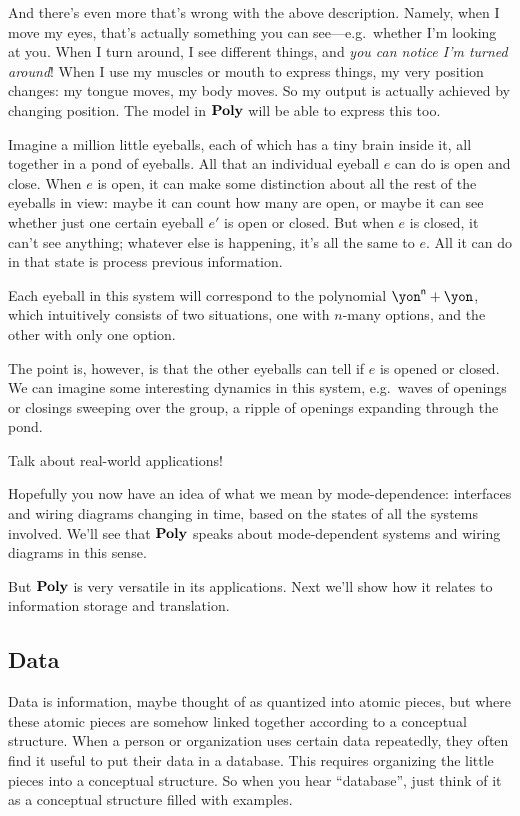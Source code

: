 \documentclass[DynamicalBook]{subfiles}
\begin{document}
And there's even more that's wrong with the above description. Namely, when I move my eyes, that's actually something you can see---e.g.\ whether I'm looking at you. When I turn around, I see different things, and \emph{you can notice I'm turned around}! When I use my muscles or mouth to express things, my very position changes: my tongue moves, my body moves. So my output is actually achieved by changing position. The model in $\textbf{Poly}$ will be able to express this too.

\begin{example}
Imagine a million little eyeballs, each of which has a tiny brain inside it, all together in a pond of eyeballs. All that an individual eyeball $e$ can do is open and close. When $e$ is open, it can make some distinction about all the rest of the eyeballs in view: maybe it can count how many are open, or maybe it can see whether just one certain eyeball $e'$ is open or closed. But when $e$ is closed, it can't see anything; whatever else is happening, it's all the same to $e$. All it can do in that state is process previous information.

Each eyeball in this system will correspond to the polynomial $\yon^\ord{n}+\yon$, which intuitively consists of two situations, one with $n$-many options, and the other with only one option.

The point is, however, is that the other eyeballs can tell if $e$ is opened or closed. We can imagine some interesting dynamics in this system, e.g.\ waves of openings or closings sweeping over the group, a ripple of openings expanding through the pond.

Talk about real-world applications!
\end{example}

Hopefully you now have an idea of what we mean by mode-dependence: interfaces and wiring diagrams changing in time, based on the states of all the systems involved. We'll see that $\textbf{Poly}$ speaks about mode-dependent systems and wiring diagrams in this sense. 

But $\textbf{Poly}$ is very versatile in its applications. Next we'll show how it relates to information storage and translation.

\subsection{Data}

Data is information, maybe thought of as quantized into atomic pieces, but where these atomic pieces are somehow linked together according to a conceptual structure. When a person or organization uses certain data repeatedly, they often find it useful to put their data in a database. This requires organizing the little pieces into a conceptual structure. So when you hear ``database'', just think of it as a conceptual structure filled with examples.
\end{document}
